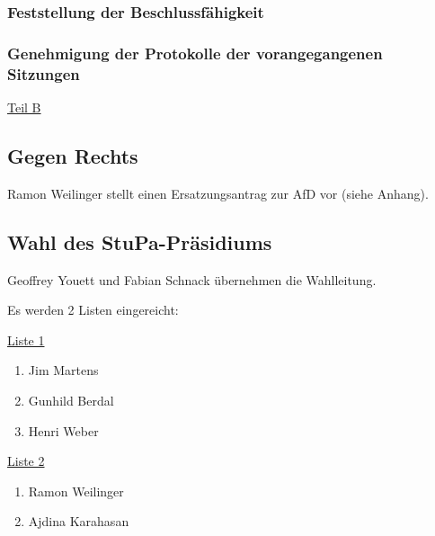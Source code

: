 \documentclass[ngerman,headheight=70pt]{scrartcl}
\begin{document}
    \subsubsection{Feststellung der Beschlussfähigkeit}

    \subsubsection{Genehmigung der Protokolle der vorangegangenen Sitzungen}

    \vspace{1cm}
    {\Large \underline{Teil B}}



    \subsection{Gegen Rechts}

    Ramon Weilinger stellt einen Ersatzungsantrag zur AfD vor (siehe Anhang).

    \subsection{Wahl des StuPa-Präsidiums}

    Geoffrey Youett und Fabian Schnack übernehmen die Wahlleitung.

    Es werden 2 Listen eingereicht:

    \underline{Liste 1}
    \begin{enumerate}
        \item Jim Martens
        \item Gunhild Berdal
        \item Henri Weber
    \end{enumerate}

    \underline{Liste 2}
    \begin{enumerate}
        \item Ramon Weilinger
        \item Ajdina Karahasan
    \end{enumerate}
\end{document}
